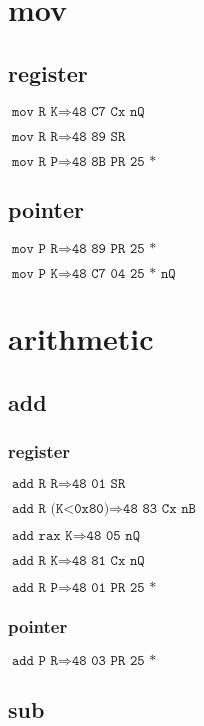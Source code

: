 \documentclass{article}
\begin{document}
\section{mov}

\subsection{register}

$\texttt{mov R K} \Rightarrow \texttt{48 C7 Cx nQ}$

$\texttt{mov R R} \Rightarrow \texttt{48 89 SR}$

$\texttt{mov R P} \Rightarrow \texttt{48 8B PR 25 *}$


\subsection{pointer}

$\texttt{mov P R} \Rightarrow \texttt{48 89 PR 25 *}$

$\texttt{mov P K} \Rightarrow \texttt{48 C7 04 25 * nQ}$


\section{arithmetic}

\subsection{add}

\subsubsection{register}

$\texttt{add R R} \Rightarrow \texttt{48 01 SR}$

$\texttt{add R (K<0x80)} \Rightarrow \texttt{48 83 Cx nB}$

$\texttt{add rax K} \Rightarrow \texttt{48 05 nQ}$

$\texttt{add R K} \Rightarrow \texttt{48 81 Cx nQ}$

$\texttt{add R P} \Rightarrow \texttt{48 01 PR 25 *}$


\subsubsection{pointer}

$\texttt{add P R} \Rightarrow \texttt{48 03 PR 25 *}$


\subsection{sub}
\end{document}
